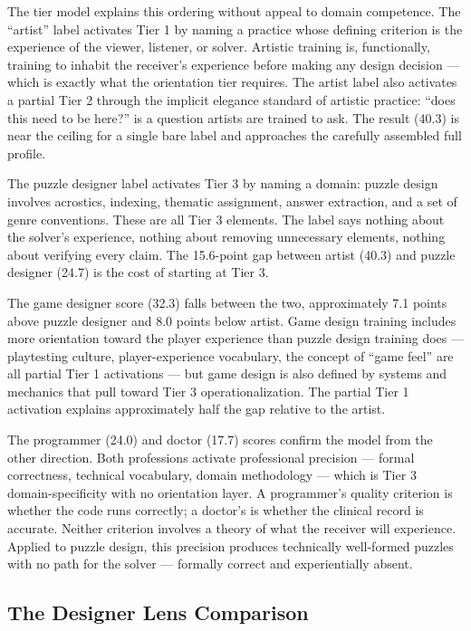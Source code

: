 The tier model explains this ordering without appeal to domain competence. The ``artist''
label activates Tier 1 by naming a practice whose defining criterion is the experience of
the viewer, listener, or solver. Artistic training is, functionally, training to inhabit
the receiver's experience before making any design decision --- which is exactly what the
orientation tier requires. The artist label also activates a partial Tier 2 through the
implicit elegance standard of artistic practice: ``does this need to be here?'' is a
question artists are trained to ask. The result (40.3) is near the ceiling for a single
bare label and approaches the carefully assembled full profile.

The puzzle designer label activates Tier 3 by naming a domain: puzzle design involves
acrostics, indexing, thematic assignment, answer extraction, and a set of genre
conventions. These are all Tier 3 elements. The label says nothing about the solver's
experience, nothing about removing unnecessary elements, nothing about verifying every
claim. The 15.6-point gap between artist (40.3) and puzzle designer (24.7) is the cost
of starting at Tier 3.

The game designer score (32.3) falls between the two, approximately 7.1 points above
puzzle designer and 8.0 points below artist. Game design training includes more
orientation toward the player experience than puzzle design training does --- playtesting
culture, player-experience vocabulary, the concept of ``game feel'' are all partial Tier
1 activations --- but game design is also defined by systems and mechanics that pull
toward Tier 3 operationalization. The partial Tier 1 activation explains approximately
half the gap relative to the artist.

The programmer (24.0) and doctor (17.7) scores confirm the model from the other
direction. Both professions activate professional precision --- formal correctness,
technical vocabulary, domain methodology --- which is Tier 3 domain-specificity with no
orientation layer. A programmer's quality criterion is whether the code runs correctly; a
doctor's is whether the clinical record is accurate. Neither criterion involves a theory
of what the receiver will experience. Applied to puzzle design, this precision produces
technically well-formed puzzles with no path for the solver --- formally correct and
experientially absent.

\subsection{The Designer Lens Comparison}


